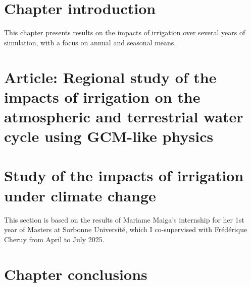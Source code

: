\section{Chapter introduction}
This chapter presents results on the impacts of irrigation over several years of simulation, with a focus on annual and seasonal means. 


\section{Article: Regional study of the impacts of irrigation on the atmospheric and terrestrial water cycle using GCM-like physics}

\section{Study of the impacts of irrigation under climate change}
This section is based on the results of Mariame Maiga's internship for her 1st year of Masters at Sorbonne Université, which I co-supervised with Frédérique Cheruy from April to July 2025.

\section{Chapter conclusions}